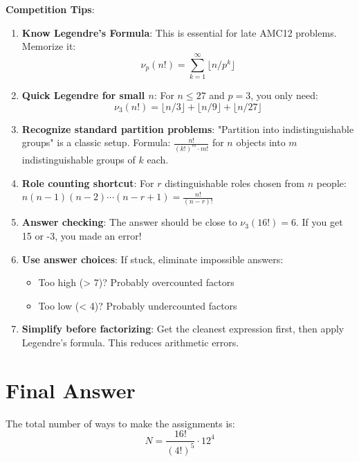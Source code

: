 \documentclass[12pt]{article}
\begin{document}
\begin{tipbox}
\textbf{Competition Tips}:

\begin{enumerate}
    \item \textbf{Know Legendre's Formula}: This is essential for late AMC12 problems. Memorize it:
    $$\nu_p(n!) = \sum_{k=1}^{\infty} \lfloor n/p^k \rfloor$$
    
    \item \textbf{Quick Legendre for small $n$}: For $n \leq 27$ and $p=3$, you only need:
    $$\nu_3(n!) = \lfloor n/3 \rfloor + \lfloor n/9 \rfloor + \lfloor n/27 \rfloor$$
    
    \item \textbf{Recognize standard partition problems}: "Partition into indistinguishable groups" is a classic setup. Formula: $\frac{n!}{(k!)^m \cdot m!}$ for $n$ objects into $m$ indistinguishable groups of $k$ each.
    
    \item \textbf{Role counting shortcut}: For $r$ distinguishable roles chosen from $n$ people: $n(n-1)(n-2)\cdots(n-r+1) = \frac{n!}{(n-r)!}$
    
    \item \textbf{Answer checking}: The answer should be close to $\nu_3(16!) = 6$. If you get 15 or -3, you made an error!
    
    \item \textbf{Use answer choices}: If stuck, eliminate impossible answers:
    \begin{itemize}
        \item Too high (> 7)? Probably overcounted factors
        \item Too low (< 4)? Probably undercounted factors
    \end{itemize}
    
    \item \textbf{Simplify before factorizing}: Get the cleanest expression first, then apply Legendre's formula. This reduces arithmetic errors.
\end{enumerate}
\end{tipbox}

\section*{Final Answer}

The total number of ways to make the assignments is:
$$N = \frac{16!}{(4!)^5} \cdot 12^4$$
\end{document}
